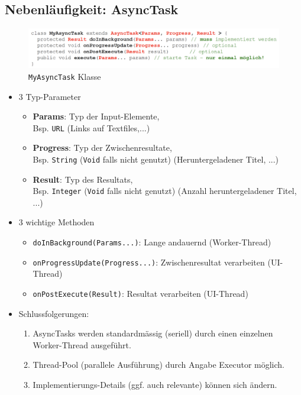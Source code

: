 \documentclass[a4paper]{article}
\begin{document}
	\newpage
	\subsection{Nebenläufigkeit: AsyncTask}
		\begin{figure}[htb!]
			\centering
			\includegraphics[width=\textwidth]{img/asynctask.png}
			\caption{\texttt{MyAsyncTask} Klasse}
		\end{figure}
		
		\begin{itemize}
			\item 3 Typ-Parameter
			\begin{itemize}
				\item \textbf{Params}: Typ der Input-Elemente, \\ Bsp. \texttt{URL} (Links auf Textfiles,...)
				\item \textbf{Progress}: Typ der Zwischenresultate, \\ Bsp. \texttt{String} (\texttt{Void} falls nicht genutzt) (Heruntergeladener Titel, ...)
				\item \textbf{Result}: Typ des Resultats, \\ Bsp. \texttt{Integer} (\texttt{Void} falls nicht genutzt) (Anzahl heruntergeladener Titel, ...)
			\end{itemize}
			\item 3 wichtige Methoden
				\begin{itemize}
					\item \texttt{doInBackground(Params...)}: Lange andauernd (Worker-Thread)
					\item \texttt{onProgressUpdate(Progress...)}: Zwischenresultat verarbeiten (UI-Thread)
					\item \texttt{onPostExecute(Result)}: Resultat verarbeiten (UI-Thread)
				\end{itemize}
			\item Schlussfolgerungen:
				\begin{enumerate}
					\item AsyncTasks werden standardmässig (seriell) durch einen einzelnen Worker-Thread ausgeführt.
					\item Thread-Pool (parallele Ausführung) durch Angabe Executor möglich.
					\item Implementierungs-Details (ggf. auch relevante) können sich ändern.
				\end{enumerate}
		\end{itemize}
		
\end{document}
